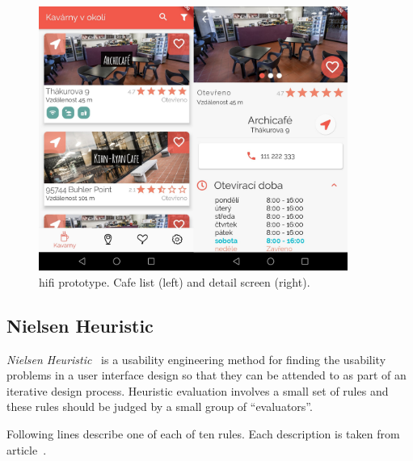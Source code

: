 
\begin{figure}[htp]
    \centering
    \includegraphics[width=0.9\textwidth]{img/analysis/hifi.jpg}
    \caption{\gls{hifi} prototype. Cafe list (left) and detail screen (right).}
    \label{fig:hifi}
\end{figure}

\subsection{Nielsen Heuristic}
\textit{Nielsen Heuristic}~\cite{nielsen} is a usability engineering method for finding the usability problems in a user interface design so that they can be attended to as part of an iterative design process. Heuristic evaluation involves a small set of rules and these rules should be judged by a small group of ``evaluators''.

Following lines describe one of each of ten rules. Each description is taken from article~\cite{nielsen}.

